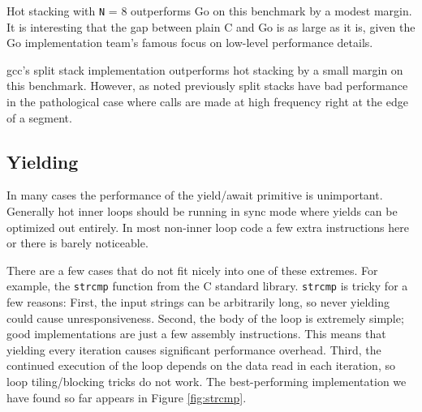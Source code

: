 \documentclass[a4paper,UKenglish,cleveref, autoref]{lipics-v2019}
\begin{document}
Hot stacking with \texttt{N} = 8 outperforms Go on this benchmark by a modest margin.
It is interesting that the gap between plain C and Go is as large as it is, given the Go implementation team's famous focus on low-level performance details.

gcc's split stack implementation outperforms hot stacking by a small margin on this benchmark.
However, as noted previously split stacks have bad performance in the pathological case where calls are made at high frequency right at the edge of a segment.

\subsection{Yielding}

In many cases the performance of the yield{\slash}await primitive is unimportant.
Generally hot inner loops should be running in sync mode where yields can be optimized out entirely.
In most non-inner loop code a few extra instructions here or there is barely noticeable.

There are a few cases that do not fit nicely into one of these extremes.
For example, the \texttt{strcmp} function from the C standard library.
\texttt{strcmp} is tricky for a few reasons:
First, the input strings can be arbitrarily long, so never yielding could cause unresponsiveness.
Second, the body of the loop is extremely simple; good implementations are just a few assembly instructions.
This means that yielding every iteration causes significant performance overhead.
Third, the continued execution of the loop depends on the data read in each iteration, so loop tiling{\slash}blocking tricks do not work.
The best-performing implementation we have found so far appears in Figure \ref{fig:strcmp}.


\end{document}
